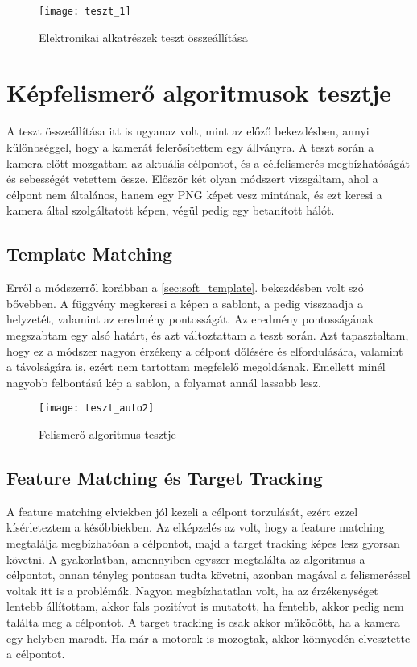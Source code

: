 \begin{figure}[h!]
	\centering
	\texttt{[image: teszt\_1]}
	\caption{Elektronikai alkatrészek teszt összeállítása}
	\label{fig:teszt_1}
\end{figure}


\pagebreak


\section{Képfelismerő algoritmusok tesztje}
A teszt összeállítása itt is ugyanaz volt, mint az előző bekezdésben, annyi különbséggel, hogy a kamerát felerősítettem egy állványra. A teszt során a kamera előtt mozgattam az aktuális célpontot, és a célfelismerés megbízhatóságát és sebességét vetettem össze. Először két olyan módszert vizsgáltam, ahol a célpont nem általános, hanem egy PNG képet vesz mintának, és ezt keresi a kamera által szolgáltatott képen, végül pedig egy betanított hálót.

\subsection*{Template Matching}
Erről a módszerről korábban a \ref{sec:soft_template}. bekezdésben volt szó bővebben. A  függvény megkeresi a képen a sablont, a  pedig visszaadja a helyzetét, valamint az eredmény pontosságát. Az eredmény pontosságának megszabtam egy alsó határt, és azt változtattam a teszt során. Azt tapasztaltam, hogy ez a módszer nagyon érzékeny a célpont dőlésére és elfordulására, valamint a távolságára is, ezért nem tartottam megfelelő megoldásnak. Emellett minél nagyobb felbontású kép a sablon, a folyamat annál lassabb lesz.
\begin{figure}[h!]
	\centering
	\texttt{[image: teszt\_auto2]}
	\caption{Felismerő algoritmus tesztje}
	\label{fig:teszt_auto2}
\end{figure}
\pagebreak

\subsection*{Feature Matching és Target Tracking}
A feature matching elviekben jól kezeli a célpont torzulását, ezért ezzel kísérleteztem a későbbiekben. Az elképzelés az volt, hogy a feature matching megtalálja megbízhatóan a célpontot, majd a target tracking képes lesz gyorsan követni. A gyakorlatban, amennyiben egyszer megtalálta az algoritmus a célpontot, onnan tényleg pontosan tudta követni, azonban magával a felismeréssel voltak itt is a problémák. Nagyon megbízhatatlan volt, ha az érzékenységet lentebb állítottam, akkor fals pozitívot is mutatott, ha fentebb, akkor pedig nem találta meg a célpontot. A target tracking is csak akkor működött, ha a kamera egy helyben maradt. Ha már a motorok is mozogtak, akkor könnyedén elvesztette a célpontot.

